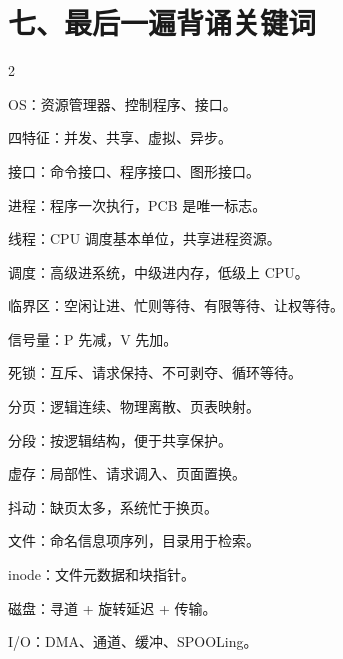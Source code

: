 \documentclass[UTF8,openany,zihao=-4]{ctexbook}
\begin{document}
\section*{七、最后一遍背诵关键词}
\begin{multicols}{2}
\begin{points}
  \item OS：资源管理器、控制程序、接口。
  \item 四特征：并发、共享、虚拟、异步。
  \item 接口：命令接口、程序接口、图形接口。
  \item 进程：程序一次执行，PCB 是唯一标志。
  \item 线程：CPU 调度基本单位，共享进程资源。
  \item 调度：高级进系统，中级进内存，低级上 CPU。
  \item 临界区：空闲让进、忙则等待、有限等待、让权等待。
  \item 信号量：P 先减，V 先加。
  \item 死锁：互斥、请求保持、不可剥夺、循环等待。
  \item 分页：逻辑连续、物理离散、页表映射。
  \item 分段：按逻辑结构，便于共享保护。
  \item 虚存：局部性、请求调入、页面置换。
  \item 抖动：缺页太多，系统忙于换页。
  \item 文件：命名信息项序列，目录用于检索。
  \item inode：文件元数据和块指针。
  \item 磁盘：寻道 + 旋转延迟 + 传输。
  \item I/O：DMA、通道、缓冲、SPOOLing。
\end{points}
\end{multicols}
\end{document}
